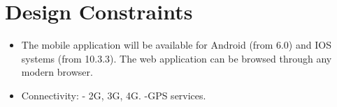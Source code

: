 \section{Design Constraints}
\begin{itemize}
\item The mobile application will be available for Android (from 6.0) and IOS systems (from 10.3.3).
The web application can be browsed through any modern browser. 
\item 
Connectivity:\newline
- 2G, 3G, 4G. \newline
-GPS services.
\end{itemize}
